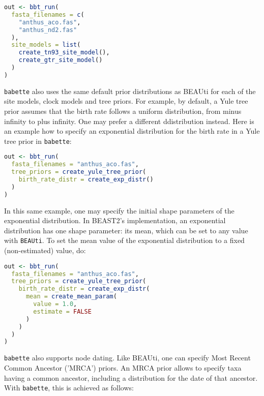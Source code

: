 \begin{lstlisting}[language=R, floatplacement=H]
out <- bbt_run(
  fasta_filenames = c(
    "anthus_aco.fas", 
    "anthus_nd2.fas"
  ),
  site_models = list(
    create_tn93_site_model(), 
    create_gtr_site_model()
  )
)
\end{lstlisting}
\verb;babette; also uses the same default prior distributions as BEAUti 
for each of the site models, clock models and tree priors. 
For example, by default, a Yule tree prior assumes that the birth rate 
follows a uniform distribution, 
from minus infinity to plus infinity. 
One may prefer a different ddistribution instead. 
Here is an example how to specify an exponential distribution for
the birth rate in a Yule tree prior in \verb;babette;:

\begin{lstlisting}[language=R, floatplacement=H]
out <- bbt_run(
  fasta_filenames = "anthus_aco.fas",
  tree_priors = create_yule_tree_prior(
    birth_rate_distr = create_exp_distr()    
  )
)
\end{lstlisting}
In this same example, one may specify
the initial shape parameters of the exponential distribution.
In BEAST2's implementation, an exponential distribution 
has one shape parameter: its mean, which can be set to any
value with \verb;BEAUti;. To set the 
mean value of the exponential distribution to a 
fixed (non-estimated) value, do: 

\begin{lstlisting}[language=R, floatplacement=H]
out <- bbt_run(
  fasta_filenames = "anthus_aco.fas",
  tree_priors = create_yule_tree_prior(
    birth_rate_distr = create_exp_distr(
      mean = create_mean_param(
        value = 1.0, 
        estimate = FALSE
      )
    )    
  )
)
\end{lstlisting}
\verb;babette; also supports node dating. Like BEAUti, one
can specify Most Recent Common Ancestor ('MRCA') priors.
An MRCA prior allows to specify taxa having a common ancestor,
including a distribution for the date of that ancestor.
With \verb;babette;, this is achieved as follows:

